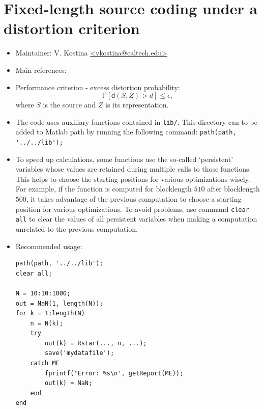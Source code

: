 \documentclass[a4paper,11p]{memoir}
\def\PP{\mathbb{P}}
\begin{document}








\chapter{Fixed-length source coding under a distortion criterion}

\begin{itemize}
\item Maintainer: V. Kostina \url{<vkostina@caltech.edu>}

\item Main references: \cite{kostina2011fixed}

\item Performance criterion - excess distortion probability: $$ \PP[ \mathsf d(S, Z) > d] \leq \epsilon,$$
where $S$ is the source and $Z$ is its representation. 


\item The code uses auxiliary functions contained in \verb|lib/|. This directory can to be added to Matlab path by running the following command: \verb|path(path, '../../lib');|

\item To speed up calculations, some functions use the so-called `persistent' variables whose values are retained during multiple calls to those functions. This helps to choose the starting positions for various optimizations wisely. For example, if the function is computed for blocklength $510$ after blocklength $500$, it takes advantage of the previous computation to choose a starting position for various optimizations. To avoid problems, use command \verb|clear all| to clear the values of all persistent variables when making a computation unrelated to the previous computation.    


\item Recommended usage: 
\begin{verbatim}
path(path, '../../lib');
clear all; 

N = 10:10:1000;
out = NaN(1, length(N));
for k = 1:length(N)
    n = N(k);  
    try
        out(k) = Rstar(..., n, ...);  
        save('mydatafile');  
    catch ME
        fprintf('Error: %s\n', getReport(ME));
        out(k) = NaN;
    end    
end
\end{verbatim}


\end{itemize}
\end{document}

